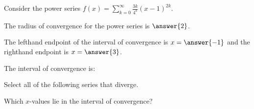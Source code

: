 \documentclass{ximera}
\author{Jim Talamo}
\begin{document}
\begin{exercise}
Consider the power series $f(x) = \sum_{k=0}^{\infty} \frac{3k}{4^k}(x-1)^{2k}$.

The radius of convergence for the power series is $\answer{2}$.

The lefthand endpoint of the interval of convergence is $x=\answer{-1}$ and the righthand endpoint is $x= \answer{3}$.

\begin{exercise}
The interval of convergence is:
\begin{multipleChoice}
\choice{$(-1,3]$}
\choice{$[-1,3)$}
\choice{$[-1,3]$}
\end{multipleChoice}

\begin{exercise}
Select all of the following series that diverge.

\begin{selectAll}
\end{selectAll}

\begin{hint}
Which $x$-values lie in the interval of convergence?
\end{hint}
\end{exercise}
\end{exercise}
\end{exercise}
\end{document}
